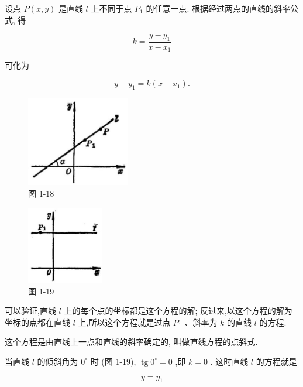 \documentclass[lang=cn,newtx,10pt,scheme=chinese]{elegantbook}
\begin{document}
设点 \(P\left( {x,y}\right)\) 是直线 \(l\) 上不同于点 \({P}_{1}\) 的任意一点. 根据经过两点的直线的斜率公式, 得

\[
  k = \frac{y - {y}_{1}}{x - {x}_{1}}
\]

可化为

\begin{corollary}[点斜式]
\[
  y - {y}_{1} = k\left( {x - {x}_{1}}\right) .
\]
\end{corollary}

\begin{figure}[h]
  \centering
  \includegraphics[max width=0.4\textwidth]{images/01912cc2-ffb6-728e-9ae7-b113ff05c64b_23_507928.jpg}
  \caption{图 1-18}
\end{figure}



\begin{figure}[h]
  \centering
  \includegraphics[max width=0.3\textwidth]{images/01912cc2-ffb6-728e-9ae7-b113ff05c64b_23_669751.jpg}
  \caption{图 1-19}
\end{figure}



可以验证,直线 \(l\) 上的每个点的坐标都是这个方程的解; 反过来,以这个方程的解为坐标的点都在直线 \(l\) 上,所以这个方程就是过点 \({P}_{1}\) 、斜率为 \(k\) 的直线 \(l\) 的方程.

这个方程是由直线上一点和直线的斜率确定的, 叫做直线方程的点斜式.

当直线 \(l\) 的倾斜角为 \({0}^{ \circ }\) 时 (图 1-19), \(\operatorname{tg}{0}^{ \circ } = 0\) ,即 \(k = 0\) . 这时直线 \(l\) 的方程就是

\[
  y = {y}_{1}
\]
\end{document}
